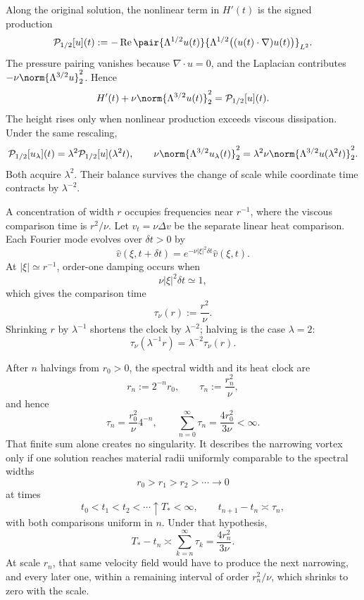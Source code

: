 Along the original solution, the nonlinear term in \(H'(t)\) is the signed production
\[
  \mathcal P_{1/2}[u](t)
  :=
  -\operatorname{Re}
  \pair
    {\Lambda^{1/2}u(t)}
    {\Lambda^{1/2}\bigl((u(t)\cdot\nabla)u(t)\bigr)}_{L^2}.
\]
The pressure pairing vanishes because \(\nabla\cdot u=0\), and the Laplacian contributes \(-\nu\norm{\Lambda^{3/2}u}_2^2\). Hence
\[
  H'(t)
  +
  \nu\norm{\Lambda^{3/2}u(t)}_2^2
  =
  \mathcal P_{1/2}[u](t).
\]
The height rises only when nonlinear production exceeds viscous dissipation. Under the same rescaling,
\[
  \mathcal P_{1/2}[u_\lambda](t)
  =
  \lambda^2\mathcal P_{1/2}[u](\lambda^2t),
  \qquad
  \nu\norm{\Lambda^{3/2}u_\lambda(t)}_2^2
  =
  \lambda^2\nu\norm{\Lambda^{3/2}u(\lambda^2t)}_2^2.
\]
Both acquire \(\lambda^2\). Their balance survives the change of scale while coordinate time contracts by \(\lambda^{-2}\).


A concentration of width \(r\) occupies frequencies near \(r^{-1}\), where the viscous comparison time is \(r^2/\nu\). Let \(v_t=\nu\Delta v\) be the separate linear heat comparison. Each Fourier mode evolves over \(\delta t>0\) by
\[
  \widehat v(\xi,t+\delta t)
  =
  e^{-\nu|\xi|^2\delta t}\widehat v(\xi,t).
\]
At \(|\xi|\simeq r^{-1}\), order-one damping occurs when
\[
  \nu|\xi|^2\delta t\simeq1,
\]
which gives the comparison time
\[
  \tau_\nu(r)
  :=
  \frac{r^2}{\nu}.
\]
Shrinking \(r\) by \(\lambda^{-1}\) shortens the clock by \(\lambda^{-2}\); halving is the case \(\lambda=2\):
\[
  \tau_\nu(\lambda^{-1}r)
  =
  \lambda^{-2}\tau_\nu(r).
\]


After \(n\) halvings from \(r_0>0\), the spectral width and its heat clock are
\[
  r_n:=2^{-n}r_0,
  \qquad
  \tau_n:=\frac{r_n^2}{\nu},
\]
and hence
\[
  \tau_n
  =
  \frac{r_0^2}{\nu}4^{-n},
  \qquad
  \sum_{n=0}^{\infty}\tau_n
  =
  \frac{4r_0^2}{3\nu}
  <
  \infty.
\]
That finite sum alone creates no singularity. It describes the narrowing vortex only if one \NavierStokes{} solution reaches material radii uniformly comparable to the spectral widths
\[
  r_0>r_1>r_2>\cdots\longrightarrow0
\]
at times
\[
  t_0<t_1<t_2<\cdots\uparrow T_*<\infty,
  \qquad
  t_{n+1}-t_n\asymp\tau_n,
\]
with both comparisons uniform in \(n\). Under that hypothesis,
\[
  T_*-t_n
  \asymp
  \sum_{k=n}^{\infty}\tau_k
  =
  \frac{4r_n^2}{3\nu}.
\]
At scale \(r_n\), that same velocity field would have to produce the next narrowing, and every later one, within a remaining interval of order \(r_n^2/\nu\), which shrinks to zero with the scale.
